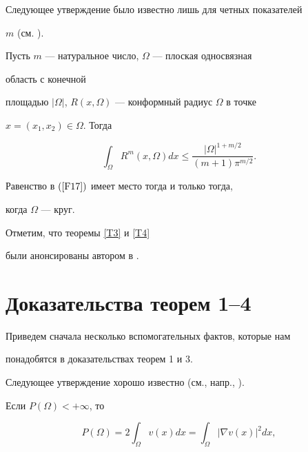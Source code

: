 Следующее утверждение было известно лишь для четных показателей


$m$ (см. \cite{l6}).





\begin{thm} \label{T4}


Пусть $m$ --- натуральное число, $\Omega$ --- плоская односвязная 


область с конечной


площадью $|\Omega|$, $R(x,\Omega)$ --- конформный радиус $\Omega$ в точке


$x=(x_1,x_2)\in \Omega$. Тогда


\begin{equation} \label{F17}


\int_\Omega R^m(x,\Omega)dx\leq \frac{|\Omega|^{1+m/2}}{(m+1)\pi^{m/2}}.


\end{equation}


Равенство в $(\ref{F17})$ имеет место тогда и только тогда, 


когда $\Omega$ --- круг.


\end{thm}





Отметим, что теоремы \ref{T3} и \ref{T4} 


были анонсированы автором в \cite{l14}.








\section{Доказательства теорем 1--4}





Приведем сначала несколько вспомогательных фактов, которые нам


понадобятся в доказательствах теорем 1 и 3.





Следующее утверждение хорошо известно (см., напр., \cite{l2}). 


Если $P(\Omega)<+\infty$, то


\begin{equation} \label{F18}


P(\Omega)=2\int_\Omega v(x) dx=\int_\Omega |\nabla v(x)|^2dx,


\end{equation}


